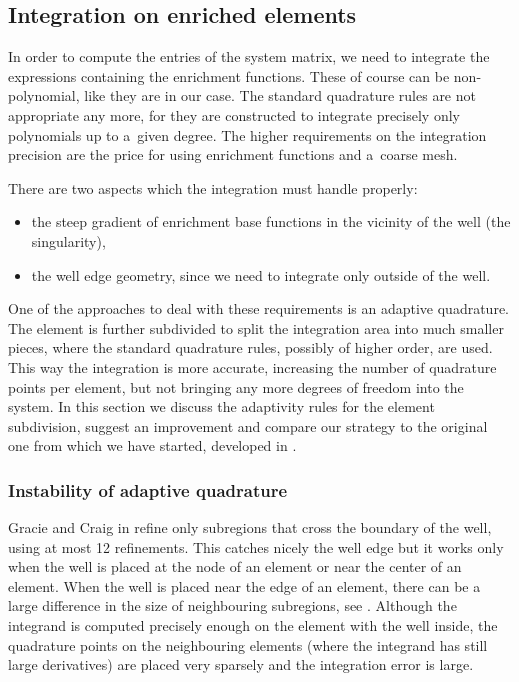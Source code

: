 \subsection{Integration on enriched elements}
\label{sec:integration}
In order to compute the entries of the system matrix, %
we need to integrate
the expressions containing the enrichment functions. These of course can be non-polynomial, like they are 
in our case. The standard quadrature rules are not appropriate any more, for they are constructed to integrate 
precisely only polynomials up to a~given degree. The higher requirements on the integration precision
are the price for using enrichment functions and a~coarse mesh.

There are two aspects which the integration must handle properly:
\begin{itemize}
  \item the steep gradient of enrichment base functions in the vicinity of the well (the singularity),
  \item the well edge geometry, since we need to integrate only outside of the well.
\end{itemize}

One of the approaches to deal with these requirements is an adaptive quadrature. The element is further subdivided 
to split the integration area into much smaller pieces, where the standard quadrature rules, possibly of higher order, are used.
This way the integration is more accurate, increasing the number of quadrature points per element, but not bringing
any more degrees of freedom into the system. In this section we discuss the adaptivity rules for the element subdivision, 
suggest an improvement and compare our strategy to the original one from which we have started, developed in \cite{gracie_modelling_2010}.

\subsubsection{Instability of adaptive quadrature}
\label{sec:refinement_element}
Gracie and Craig in \cite{gracie_modelling_2010} refine only subregions that cross the boundary of the well, using at most 12 refinements.
This catches nicely the well edge but it works only when the well is placed at the node of an element or near the center of an element. 
When the well is placed near the edge of an element, there can be
a large difference in the size of neighbouring subregions, see . Although
the integrand is computed precisely enough on the element with the well inside, the quadrature points on the
neighbouring elements (where the integrand has still large derivatives) are placed very sparsely 
and the integration error is large.

